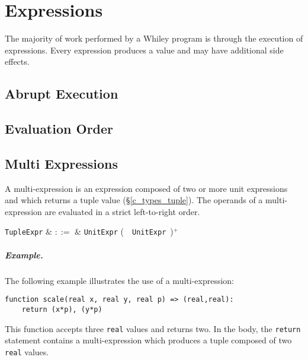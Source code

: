 \chapter{Expressions}
The majority of work performed by a Whiley program is through the execution of \glspl{expression}.  Every expression produces a \gls{value} and may have additional side effects.

\section{Abrupt Execution}

\section{Evaluation Order}


\section{Multi Expressions}
\label{c_expr_tuple}
A multi-expression is an expression composed of two or more unit expressions and which returns a tuple value (\S\ref{c_types_tuple}).  The operands of a multi-expression are evaluated in a strict left-to-right order.

\begin{syntax}
  \verb+TupleExpr+ & $::=$ & \verb+UnitExpr+ \big(\ \token{,}\ \verb+UnitExpr+\ \big)$^+$ \\
\end{syntax}

\paragraph{Example.}  The following example illustrates the use of a multi-expression:

\begin{lstlisting}
function scale(real x, real y, real p) => (real,real):
    return (x*p), (y*p)
\end{lstlisting}

This function accepts three \lstinline{real} values and returns two.  In the body, the \lstinline{return} statement contains a multi-expression which produces a tuple composed of two \lstinline{real} values.


